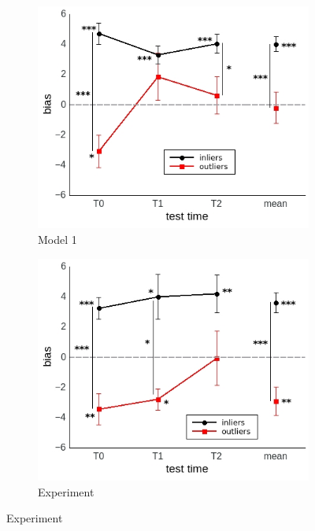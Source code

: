 \documentclass[a4paper]{scrreprt}
\begin{document}
\begin{figure}
\centering
\begin{subfigure}[b]{0.49\textwidth}
        \includegraphics[width=\textwidth]{figs/sec3/outliers/outliers_mod1mod1.jpeg}
        \caption{Model 1}
    \end{subfigure}
    \begin{subfigure}[b]{0.49\textwidth}
        \includegraphics[width=\textwidth]{figs/sec3/outliers/outliers_mod1dat.jpeg}
        \caption{Experiment}
    \end{subfigure}


\end{figure}
\end{document}
